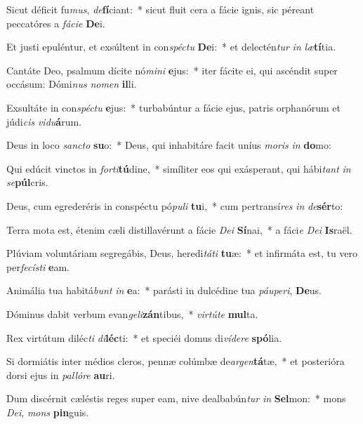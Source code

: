 \item Sicut déficit fu\textit{mus}, \textit{de}\textbf{fí}ciant:~* sicut fluit cera a fácie ignis, sic péreant peccatóres a \textit{fá}\textit{ci}\textit{e} \textbf{De}i.
\item Et justi epuléntur, et exsúltent in con\textit{spéc}\textit{tu} \textbf{De}i:~* et delectén\textit{tur} \textit{in} \textit{læ}\textbf{tí}tia.
\item Cantáte Deo, psalmum dícite nó\textit{mi}\textit{ni} \textbf{e}jus:~* iter fácite ei, qui ascéndit super occásum: Dómi\textit{nus} \textit{no}\textit{men} \textbf{il}li.
\item Exsultáte in con\textit{spéc}\textit{tu} \textbf{e}jus:~* turbabúntur a fácie ejus, patris orphanórum et júdi\textit{cis} \textit{vi}\textit{du}\textbf{á}rum.
\item Deus in loco \textit{sanc}\textit{to} \textbf{su}o:~* Deus, qui inhabitáre facit uníus \textit{mo}\textit{ris} \textit{in} \textbf{do}mo:
\item Qui edúcit vinctos in \textit{for}\textit{ti}\textbf{tú}dine,~* simíliter eos qui exásperant, qui hábi\textit{tant} \textit{in} \textit{se}\textbf{púl}cris.
\item Deus, cum egrederéris in conspéctu pó\textit{pu}\textit{li} \textbf{tu}i,~* cum pertransí\textit{res} \textit{in} \textit{de}\textbf{sér}to:
\item Terra mota est, étenim cæli distillavérunt a fácie \textit{De}\textit{i} \textbf{Sí}nai,~* a fáci\textit{e} \textit{De}\textit{i} \textbf{Is}raël.
\item Plúviam voluntáriam segregábis, Deus, heredi\textit{tá}\textit{ti} \textbf{tu}æ:~* et infirmáta est, tu vero per\textit{fe}\textit{cís}\textit{ti} \textbf{e}am.
\item Animália tua habitá\textit{bunt} \textit{in} \textbf{e}a:~* parásti in dulcédine tua \textit{páu}\textit{pe}\textit{ri}, \textbf{De}us.
\item Dóminus dabit verbum evan\textit{ge}\textit{li}\textbf{zán}tibus,~* \textit{vir}\textit{tú}\textit{te} \textbf{mul}ta.
\item Rex virtútum diléc\textit{ti} \textit{di}\textbf{léc}ti:~* et speciéi domus di\textit{ví}\textit{de}\textit{re} \textbf{spó}lia.
\item Si dormiátis inter médios cleros, pennæ colúmbæ de\textit{ar}\textit{gen}\textbf{tá}tæ,~* et posterióra dorsi ejus in \textit{pal}\textit{ló}\textit{re} \textbf{au}ri.
\item Dum discérnit cæléstis reges super eam, nive dealbabún\textit{tur} \textit{in} \textbf{Sel}mon:~* mons \textit{De}\textit{i}, \textit{mons} \textbf{pin}guis.
